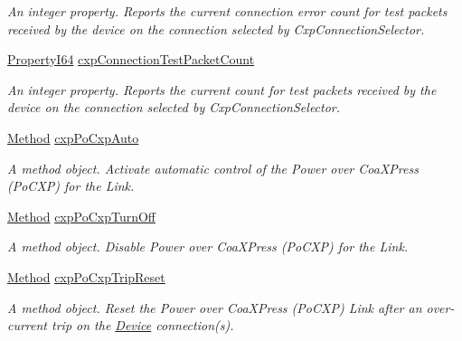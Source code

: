 \begin{DoxyCompactItemize}
\begin{DoxyCompactList}\small\item\em An integer property. Reports the current connection error count for test packets received by the device on the connection selected by Cxp\+Connection\+Selector. \end{DoxyCompactList}\item 
\hyperlink{group___common_interface_ga81749b2696755513663492664a18a893}{Property\+I64} \hyperlink{classmv_i_m_p_a_c_t_1_1acquire_1_1_gen_i_cam_1_1_transport_layer_control_a24bdadbf9fa1a55252a8c1d56f541000}{cxp\+Connection\+Test\+Packet\+Count}
\begin{DoxyCompactList}\small\item\em An integer property. Reports the current count for test packets received by the device on the connection selected by Cxp\+Connection\+Selector. \end{DoxyCompactList}\item 
\hyperlink{classmv_i_m_p_a_c_t_1_1acquire_1_1_method}{Method} \hyperlink{classmv_i_m_p_a_c_t_1_1acquire_1_1_gen_i_cam_1_1_transport_layer_control_ae9d8d9034b0e8625ee58c7af260e02d8}{cxp\+Po\+Cxp\+Auto}
\begin{DoxyCompactList}\small\item\em A method object. Activate automatic control of the Power over Coa\+X\+Press (Po\+C\+X\+P) for the Link. \end{DoxyCompactList}\item 
\hyperlink{classmv_i_m_p_a_c_t_1_1acquire_1_1_method}{Method} \hyperlink{classmv_i_m_p_a_c_t_1_1acquire_1_1_gen_i_cam_1_1_transport_layer_control_a0d76d661f400c5193f7af6a5c3dbb5fb}{cxp\+Po\+Cxp\+Turn\+Off}
\begin{DoxyCompactList}\small\item\em A method object. Disable Power over Coa\+X\+Press (Po\+C\+X\+P) for the Link. \end{DoxyCompactList}\item 
\hyperlink{classmv_i_m_p_a_c_t_1_1acquire_1_1_method}{Method} \hyperlink{classmv_i_m_p_a_c_t_1_1acquire_1_1_gen_i_cam_1_1_transport_layer_control_a8f65a0fd2c506615dff20133a3982b65}{cxp\+Po\+Cxp\+Trip\+Reset}
\begin{DoxyCompactList}\small\item\em A method object. Reset the Power over Coa\+X\+Press (Po\+C\+X\+P) Link after an over-\/current trip on the \hyperlink{classmv_i_m_p_a_c_t_1_1acquire_1_1_device}{Device} connection(s). \end{DoxyCompactList}\item 

\end{DoxyCompactItemize}
